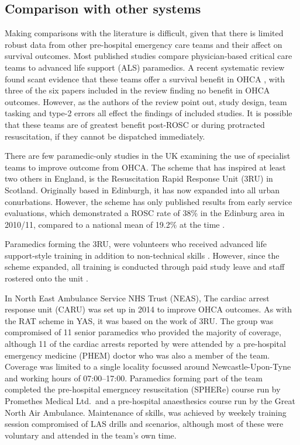\documentclass[]{article}
\theoremstyle{definition}
\theoremstyle{definition}
\theoremstyle{definition}
\theoremstyle{remark}
\begin{document}
\hypertarget{comparison-with-other-systems}{%
\subsection{Comparison with other
systems}\label{comparison-with-other-systems}}

Making comparisons with the literature is difficult, given that there is
limited robust data from other pre-hospital emergency care teams and
their affect on survival outcomes. Most published studies compare
physician-based critical care teams to advanced life support (ALS)
paramedics. A recent systematic review found scant evidence that these
teams offer a survival benefit in OHCA
\citep{von_vopelius-feldt_systematic_2017}, with three of the six papers
included in the review finding no benefit in OHCA outcomes. However, as
the authors of the review point out, study design, team tasking and
type-2 errors all effect the findings of included studies. It is
possible that these teams are of greatest benefit post-ROSC or during
protracted resuscitation, if they cannot be dispatched immediately.

There are few paramedic-only studies in the UK examining the use of
specialist teams to improve outcome from OHCA. The scheme that has
inspired at least two others in England, is the Resuscitation Rapid
Response Unit (3RU) in Scotland. Originally based in Edinburgh, it has
now expanded into all urban conurbations. However, the scheme has only
published results from early service evaluations, which demonstrated a
ROSC rate of 38\% in the Edinburg area in 2010/11, compared to a
national mean of 19.2\% at the time \citep{clegg_using_2012}.

Paramedics forming the 3RU, were volunteers who received advanced life
support-style training in addition to non-technical skills
\citep{clarke_specialist_2014}. However, since the scheme expanded, all
training is conducted through paid study leave and staff rostered onto
the unit \citep{short_3ru_2018}.

In North East Ambulance Service NHS Trust (NEAS), The cardiac arrest
response unit (CARU) was set up in 2014 to improve OHCA outcomes. As
with the RAT scheme in YAS, it was based on the work of 3RU. The group
was compromised of 11 senior paramedics who provided the majority of
coverage, although 11 of the cardiac arrests reported by
\citet{mcclelland_service_2016} were attended by a pre-hospital
emergency medicine (PHEM) doctor who was also a member of the team.
Coverage was limited to a single locality focussed around
Newcastle-Upon-Tyne and working hours of 07:00--17:00. Paramedics
forming part of the team completed the pre-hospital emergncey
resuscitation (SPHERe) course run by Promethes Medical Ltd.~and a
pre-hospital anaesthesics course run by the Great North Air Ambulance.
Maintenance of skills, was achieved by weekely training session
compromised of LAS drills and scenarios, although most of these were
voluntary and attended in the team's own time.
\end{document}
